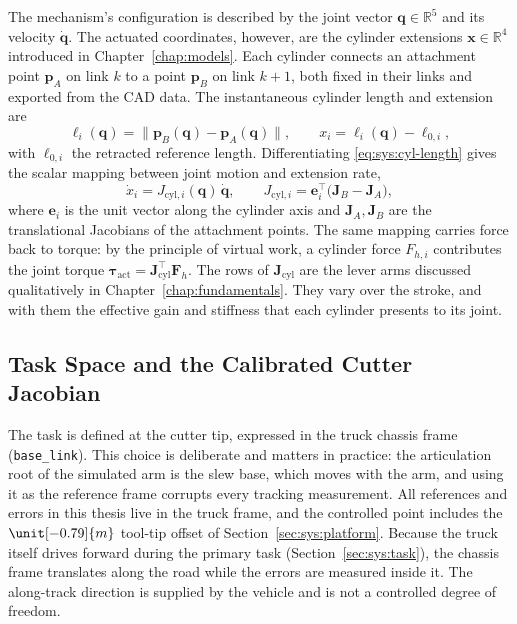 The mechanism's configuration is described by the joint vector
$\bm{q} \in \mathbb{R}^5$ and its velocity $\dot{\bm{q}}$. The actuated
coordinates, however, are the cylinder extensions
$\bm{x} \in \mathbb{R}^4$ introduced in Chapter~\ref{chap:models}. Each
cylinder connects an attachment point $\bm{p}_A$ on link $k$ to a point
$\bm{p}_B$ on link $k{+}1$, both fixed in their links and exported from
the CAD data. The instantaneous cylinder length and extension are
%
\begin{equation}
  \label{eq:sys:cyl-length}
  \ell_i(\bm{q}) = \bigl\| \bm{p}_B(\bm{q}) - \bm{p}_A(\bm{q}) \bigr\|,
  \qquad
  x_i = \ell_i(\bm{q}) - \ell_{0,i},
\end{equation}
%
with $\ell_{0,i}$ the retracted reference length. Differentiating
\eqref{eq:sys:cyl-length} gives the scalar mapping between joint motion
and extension rate,
%
\begin{equation}
  \label{eq:sys:cyl-jac}
  \dot{x}_i = J_{\mathrm{cyl},i}(\bm{q})\, \dot{\bm{q}},
  \qquad
  J_{\mathrm{cyl},i} = \bm{e}_i^{\!\top}
  \bigl( \bm{J}_B - \bm{J}_A \bigr),
\end{equation}
%
where $\bm{e}_i$ is the unit vector along the cylinder axis and
$\bm{J}_A, \bm{J}_B$ are the translational Jacobians of the attachment
points. The same mapping carries force back to torque: by the principle
of virtual work, a cylinder force $F_{h,i}$ contributes the joint
torque $\bm{\tau}_{\mathrm{act}} = \bm{J}_{\mathrm{cyl}}^{\top}
\bm{F}_h$. The rows of $\bm{J}_{\mathrm{cyl}}$ are the lever arms
discussed qualitatively in Chapter~\ref{chap:fundamentals}. They vary
over the stroke, and with them the effective gain and stiffness that
each cylinder presents to its joint.

\subsection{Task Space and the Calibrated Cutter Jacobian}
\label{sec:sys:task-jacobian}

The task is defined at the cutter tip, expressed in the truck chassis
frame (\texttt{base\_link}). This choice is deliberate and matters in
practice: the articulation root of the simulated arm is the slew base,
which moves with the arm, and using it as the reference frame corrupts
every tracking measurement. All references and errors in this thesis
live in the truck frame, and the controlled point includes the
$\unit[-0.79]{m}$ tool-tip offset of Section~\ref{sec:sys:platform}.
Because the truck itself drives forward during the primary task
(Section~\ref{sec:sys:task}), the chassis frame translates along the
road while the errors are measured inside it. The along-track direction
is supplied by the vehicle and is not a controlled degree of freedom.

